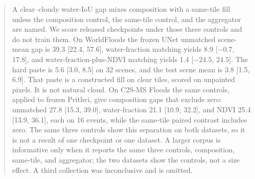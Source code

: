 \begin{abstract}
A clear--cloudy water-IoU gap mixes composition with a same-tile fill unless the composition control, the same-tile control, and the aggregator are named.
We score released checkpoints under those three controls and do not train them.
On WorldFloods the frozen UNet unmatched scene-mean gap is 39.3 [22.4, 57.6], water-fraction matching yields 8.9 [$-0.7$, 17.8], and water-fraction-plus-NDVI matching yields 1.4 [$-24.5$, 24.5].
The hard paste is 5.6 [3.0, 8.5] on 32 scenes, and the test scene mean is 3.8 [1.5, 6.9].
That paste is a constructed fill on clear tiles, scored on unpainted pixels.
It is not natural cloud.
On C2S-MS Floods the same controls, applied to frozen Prithvi, give composition gaps that exclude zero: unmatched 27.8 [15.3, 39.0], water-fraction 21.1 [10.9, 32.2], and NDVI 25.4 [13.9, 36.1], each on 16 events, while the same-tile paired contrast includes zero.
The same three controls show this separation on both datasets, so it is not a result of one checkpoint or one dataset.
A larger corpus is informative only when it reports the same three controls, composition, same-tile, and aggregator; the two datasets show the controls, not a size effect.
A third collection was inconclusive and is omitted.
\end{abstract}
